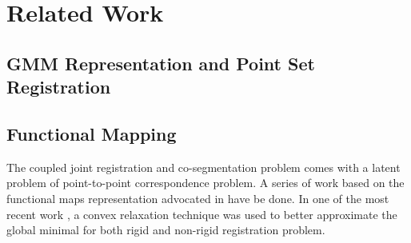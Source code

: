 \section{Related Work}
\label{sec:rw}
\subsection{GMM Representation and Point Set Registration}

\subsection{Functional Mapping}
The coupled joint registration and co-segmentation problem comes with a latent problem of point-to-point correspondence problem. A series of work based on the functional maps representation advocated in \cite{Ovsjanikov:2012:FMF:2185520.2185526} have be done. In one of the most recent work \cite{Maron:2016:ConvRelax}, a convex relaxation technique was used to better approximate the global minimal for both rigid and non-rigid registration problem.   